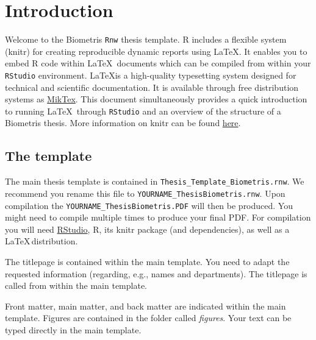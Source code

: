 \documentclass{amsart}
\theoremstyle{plain}
\begin{document}
\section{Introduction}\label{Intro}
Welcome to the Biometris \texttt{Rnw} thesis template.
\textsf{R} includes a flexible system (\textsf{knitr}) for creating reproducible dynamic reports using \LaTeX. 
It enables you to embed \textsf{R} code within \LaTeX \, documents which can be compiled from within your \texttt{RStudio} environment.
\LaTeX is a high-quality typesetting system designed for technical and scientific documentation.
It is available through free distribution systems as \href{https://miktex.org/}{MikTex}.
This document simultaneously provides a quick introduction to running \LaTeX \, through \texttt{RStudio} and an overview of the structure of a Biometris thesis.
More information on \textsf{knitr} can be found \href{https://support.rstudio.com/hc/en-us/articles/200552056-Using-Sweave-and-knitr}{here}.


\subsection{The template}\label{Template}
\begin{sloppypar}
The main thesis template is contained in \texttt{Thesis\_Template\_Biometris.rnw}.
We recommend you rename this file to \texttt{YOURNAME\_ThesisBiometris.rnw}.
Upon compilation the \texttt{YOURNAME\_ThesisBiometris.PDF} will then be produced.
You might need to compile multiple times to produce your final PDF.
For compilation you will need \href{https://www.rstudio.com/}{RStudio}, \textsf{R}, its \textsf{knitr} package (and dependencies), as well as a \LaTeX \,distribution. 
\end{sloppypar}

The titlepage is contained within the main template.
You need to adapt the requested information (regarding, e.g., names and departments).
The titlepage is called from within the main template.

Front matter, main matter, and back matter are indicated within the main template.
Figures are contained in the folder called \emph{figures}.
Your text can be typed directly in the main template.
\end{document}
